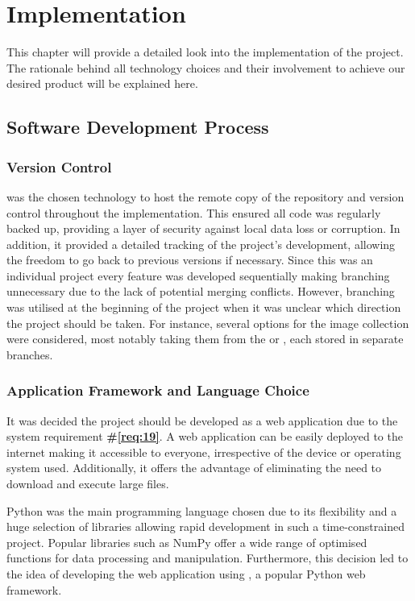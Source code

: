 \documentclass{l4proj}
\begin{document}
\chapter{Implementation}
This chapter will provide a detailed look into the implementation of the project. The rationale behind all technology choices and their involvement to achieve our desired product will be explained here. 

\section{Software Development Process}
\subsection{Version Control}
\cite{github} was the chosen technology to host the remote copy of the repository and version control throughout the implementation. This ensured all code was regularly backed up, providing a layer of security against local data loss or corruption. In addition, it provided a detailed tracking of the project's development, allowing the freedom to go back to previous versions if necessary. Since this was an individual project every feature was developed sequentially making branching unnecessary due to the lack of potential merging conflicts. However, branching was utilised at the beginning of the project when it was unclear which direction the project should be taken. For instance, several options for the image collection were considered, most notably taking them from the \cite{wikimedia_commons} or \cite{imagenet}, each stored in separate branches.


\subsection{Application Framework and Language Choice}
It was decided the project should be developed as a web application due to the system requirement \textbf{\#\ref{req:19}}. A web application can be easily deployed to the internet making it accessible to everyone, irrespective of the device or operating system used. Additionally, it offers the advantage of eliminating the need to download and execute large files.

Python \citep{python} was the main programming language chosen due to its flexibility and a huge selection of libraries allowing rapid development in such a time-constrained project. Popular libraries such as NumPy \citep{harris2020numpy} offer a wide range of optimised functions for data processing and manipulation. Furthermore, this decision led to the idea of developing the web application using \cite{django}, a popular Python web framework.
\end{document}
